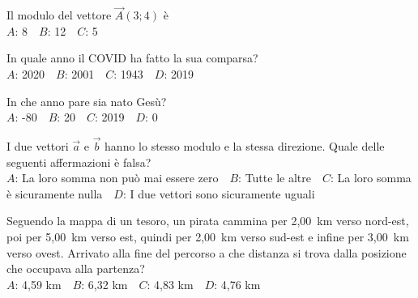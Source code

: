 \def\mcquestionnumber{6}


\mcquestionheader Il modulo del vettore $\vec{A}(3;4)$ è\\
{$A$}: 8\ \ {$B$}: 12\ \ {$C$}: 5\ \ 

\mcquestionfooter



\def\mcquestionnumber{7}


\mcquestionheader In quale anno il COVID ha fatto la sua comparsa?\\
{$A$}: 2020\ \ {$B$}: 2001\ \ {$C$}: 1943\ \ {$D$}: 2019\ \ 

\mcquestionfooter



\def\mcquestionnumber{8}


\mcquestionheader In che anno pare sia nato Gesù?\\
{$A$}: -80\ \ {$B$}: 20\ \ {$C$}: 2019\ \ {$D$}: 0\ \ 

\mcquestionfooter



\def\mcquestionnumber{9}


\mcquestionheader I due vettori $\vec{a}$ e $\vec{b}$ hanno lo stesso modulo e la stessa direzione. Quale delle seguenti affermazioni è falsa?\\
{$A$}: La loro somma non può mai essere zero\ \ {$B$}: Tutte le altre\ \ {$C$}: La loro somma è sicuramente nulla\ \ {$D$}: I due vettori sono sicuramente uguali\ \ 

\mcquestionfooter



\def\mcquestionnumber{10}


\mcquestionheader Seguendo la mappa di un tesoro, un pirata cammina per 2,00~km verso nord-est, poi per 5,00~km verso est, quindi per 2,00~km verso sud-est e infine per 3,00~km verso ovest. Arrivato alla fine del percorso a che distanza si trova dalla posizione che occupava alla partenza?\\
{$A$}: 4,59 km\ \ {$B$}: 6,32 km\ \ {$C$}: 4,83 km\ \ {$D$}: 4,76 km\ \ 

\mcquestionfooter



\def\mcquestionnumber{11}


